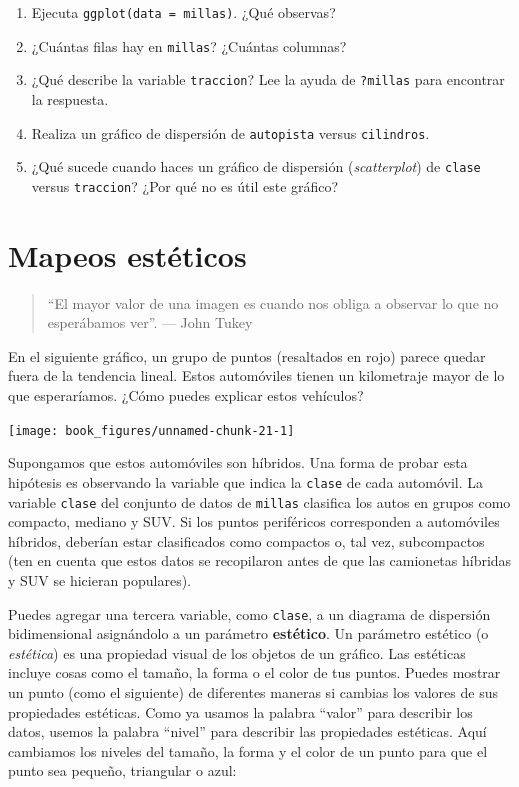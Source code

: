 \documentclass[11pt,oneside]{report}
\begin{document}
\begin{enumerate}
\def\labelenumi{\arabic{enumi}.}
\item
  Ejecuta \texttt{ggplot(data\ =\ millas)}. ¿Qué observas?
\item
  ¿Cuántas filas hay en \texttt{millas}? ¿Cuántas columnas?
\item
  ¿Qué describe la variable \texttt{traccion}? Lee la ayuda de
  \texttt{?millas} para encontrar la respuesta.
\item
  Realiza un gráfico de dispersión de \texttt{autopista} versus
  \texttt{cilindros}.
\item
  ¿Qué sucede cuando haces un gráfico de dispersión (\emph{scatterplot})
  de \texttt{clase} versus \texttt{traccion}? ¿Por qué no es útil este
  gráfico?
\end{enumerate}

\hypertarget{mapeos-estuxe9ticos}{%
\section{Mapeos estéticos}\label{mapeos-estuxe9ticos}}

\begin{quote}
``El mayor valor de una imagen es cuando nos obliga a observar lo que no
esperábamos ver''. --- John Tukey
\end{quote}

En el siguiente gráfico, un grupo de puntos (resaltados en rojo) parece
quedar fuera de la tendencia lineal. Estos automóviles tienen un
kilometraje mayor de lo que esperaríamos. ¿Cómo puedes explicar estos
vehículos?

\begin{center}\texttt{[image: book\_figures/unnamed-chunk-21-1]} \end{center}

Supongamos que estos automóviles son híbridos. Una forma de probar esta
hipótesis es observando la variable que indica la \texttt{clase} de cada
automóvil. La variable \texttt{clase} del conjunto de datos de
\texttt{millas} clasifica los autos en grupos como compacto, mediano y
SUV. Si los puntos periféricos corresponden a automóviles híbridos,
deberían estar clasificados como compactos o, tal vez, subcompactos (ten
en cuenta que estos datos se recopilaron antes de que las camionetas
híbridas y SUV se hicieran populares).

Puedes agregar una tercera variable, como \texttt{clase}, a un diagrama
de dispersión bidimensional asignándolo a un parámetro
\textbf{estético}. Un parámetro estético (o \emph{estética}) es una
propiedad visual de los objetos de un gráfico. Las estéticas incluye
cosas como el tamaño, la forma o el color de tus puntos. Puedes mostrar
un punto (como el siguiente) de diferentes maneras si cambias los
valores de sus propiedades estéticas. Como ya usamos la palabra
``valor'' para describir los datos, usemos la palabra ``nivel'' para
describir las propiedades estéticas. Aquí cambiamos los niveles del
tamaño, la forma y el color de un punto para que el punto sea pequeño,
triangular o azul:
\end{document}
